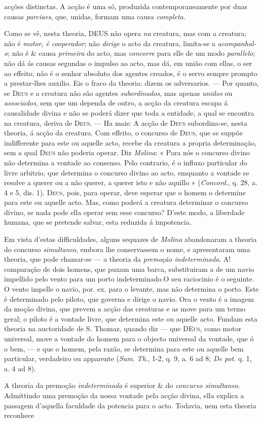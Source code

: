acções distinctas. A acção é uma só, produzida contemporaneamente por duas causas \emph{parciaes}, que, unidas, formam uma causa \emph{completa}.\par Como se vê, nesta theoria, \textsc{DEUS} não opera \emph{na} creatura, mas com a creatura; não é \emph{motor}, \emph{é cooperador}; não \emph{dirige} o acto da creatura, limita-se a \emph{acompanhal-o}; não é \& causa \emph{primeira} do acto, mas \emph{concorre} para elle de um modo \emph{parallelo}; não dá ás causas segundas o impulso ao acto, mas dá, em união com ellas, o ser ao effeito; não é o senhor absoluto dos agentes creados, é o servo sempre prompto a prestar-lhes auxilio. Eis o fraco da theoria: dizem os adversarios. --- Por quanto, se \textsc{Deus} e a creatura não são agentes \emph{subordinados}, mas apenas \emph{unidos} ou \emph{associados}, sem que um dependa de outro, a acção da creatura escapa á causalidade divina e não se poderá dizer que toda a entidade, a qual se encontra na creatura, deriva de \textsc{Deus}. --- Ha mais: A acção de \textsc{Deus} subordina-se, nesta theoria, á acção da creatura. Com effeito, o concurso de \textsc{Deus}, que se suppõe indifferente para este ou aquelle acto, recebe da creatura a propria determinação, sem a qual \textsc{Deus} não poderia operar. Diz \emph{Molina}: « Para nós o concurso divino não determina a vontade ao consenso. Pelo contrario, é o influxo particular do livre arbitrio, que determina o concurso divino ao acto, emquanto a vontade se resolve a querer ou a não querer, a querer isto e não aquillo » (\emph{Concord}., q. 28, a. 4 e 5, dis. 1). \textsc{Deus}, pois, para operar, deve esperar que o homem o determine para este ou aquelle acto. Mas, como poderá a creatura determinar o concurso divino, se nada pode ella operar sem esse concurso? D'este modo, a liberdade humana, que se pretende salvar, esta reduzida á impotencia.\par Em vista d'estas difficuldades, alguns sequazes de \emph{Molina} abandonaram a theoria do concurso \emph{simultaneo}, embora lhe conservassem o nome, e apresentaram uma theoria, que pode chamar-se --- a theoria da \emph{premoção indeterminada}. A! comparação de dois homens, que puxam uma barca, substituiram a de um navio impellido pelo vento para um porto indeterminado.O seu raciocinio é o seguinte. O vento impelle o navio, por. ex. para o levante, mas não determina o porto. Este é determinado pelo piloto, que governa e dirige o navio. Ora o vento é a imagem da moção divina, que prevem a acção das creaturas e as move para um termo geral; o piloto é a vontade livre, que determina este ou aquelle acto. Fundam esta theoria na auctoridade de S. Thomaz, quando diz --- que \textsc{DEus}, como motor universal, move a vontade do homem para o objecto universal da vontade, que ó o bem, --- e que o homem, pela razão, se determina para este ou aquelle bem particular, verdadeiro ou apparente (\emph{Sum}. \emph{Th}., 1-2, q. 9, a. 6 ad 8; \emph{De pot}. q. 1, a. 4 ad 8).\par A theoria da premoção \emph{indeterminada} é superior \& do \emph{concurso simultaneo}. Admittindo uma premoção da nossa vontade pela acção divina, ella explica a passagem d'aquella faculdade da potencia para o acto. Todavia, nem esta theoria reconhece 